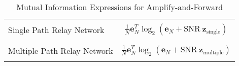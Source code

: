 \begin{table}
 \caption[Mutual Information Expressions]{Mutual Information Expressions for Amplify-and-Forward}
 \begin{center}
  \begin{tabular}{|l|c|}
\hline
& \\
  {Single Path Relay Network} &
$\frac{1}{N} \mathbf{e}_N^T \log_2 \left( \mathbf{e}_N + \mbox{SNR} \: \mathbf{z}_{\mbox{single}} \right)$ \\
& \\
\hline
& \\
  {Multiple Path Relay Network} & 
$\frac{1}{N} \mathbf{e}_N^T \log_2 \left( \mathbf{e}_N + \mbox{SNR} \: \mathbf{z}_{\mbox{multiple}} \right)$ \\
& \\
\hline
  \end{tabular}
  \label{tab:I}
 \end{center}
\end{table}